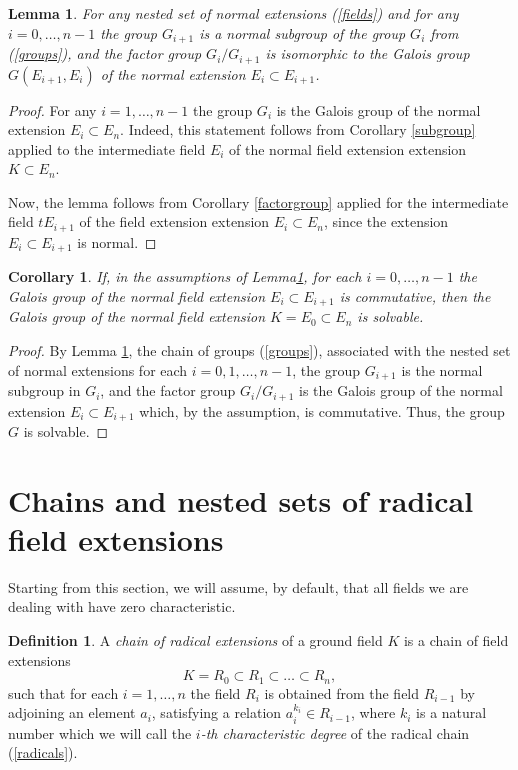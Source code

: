 \documentclass[11pt]{article}
\theoremstyle{plain}
\newtheorem{lemma}[theorem]{Lemma}
\newtheorem{corollary}[theorem]{Corollary}
\theoremstyle{definition}
\newtheorem{definition}[theorem]{Definition}
\begin{document}
\begin{lemma}\label{chain} For any nested set of normal extensions  (\ref{fields}) and  for any $i= 0, \dots, n-1$ the  group   $G_{i+1}$ is a normal subgroup of the group $G_i$ from (\ref{groups}), and the factor group $G_i/G_{i+1}$ is isomorphic to the Galois group $G(E_{i+1}, E_i)$ of the normal extension $E_i\subset E_{i+1}$.
\end{lemma}


\begin{proof} For any $i=1,\dots,n-1$  the group $G_i$ is the Galois group of the normal extension $E_i\subset E_n$. Indeed, this statement follows from Corollary \ref {subgroup} applied to the intermediate field $E_i$  of the normal field extension extension  $K\subset E_n$.

 Now, the lemma follows from Corollary \ref{factorgroup} applied for the intermediate field $t E_{i+1}$ of the field extension extension  $E_i\subset E_n$, since the extension $E_i\subset E_{i+1}$ is normal.

 \end{proof}

\begin{corollary}\label{norm}  If, in the assumptions of Lemma\ref{chain}, for each $i=0,\dots,n-1$ the  Galois group of the normal field  extension $E_i\subset E_{i+1}$ is commutative, then the Galois group of the normal field extension  $K=E_0\subset E_n$ is solvable.
 \end{corollary}

 \begin{proof}  By Lemma \ref{chain}, the chain of groups (\ref{groups}), associated with the nested set of normal extensions for each $i=0,1,\dots,n-1$,  the group $G_{i+1}$ is the normal subgroup in $G_i$, and the factor group $G_i/G_{i+1}$ is the Galois group of the normal extension $E_i\subset E_{i+1}$ which, by the assumption, is commutative. Thus, the group $G$ is solvable.
 \end{proof} 

\section{Chains and nested sets of radical field extensions}

Starting from this section, we will assume, by default, that all fields we are dealing with have zero characteristic.

\begin{definition} A {\it  chain of  radical extensions} of a ground field $K$  is a chain  of field extensions
\begin{equation}\label{radicals}
K=R_0\subset R_1\subset \dots \subset R_n,
\end{equation}
such that for each $i=1,\dots,n$
the field $R_i$ is obtained from the field $R_{i-1}$ by adjoining  an element $a_i$,  satisfying a relation $a_i^{k_i}\in  R_{i-1}$, where $k_i$ is  a natural number which we will call  the  {\it $i$-th characteristic degree} of the radical chain (\ref{radicals}).
\end{definition}
\end{document}
